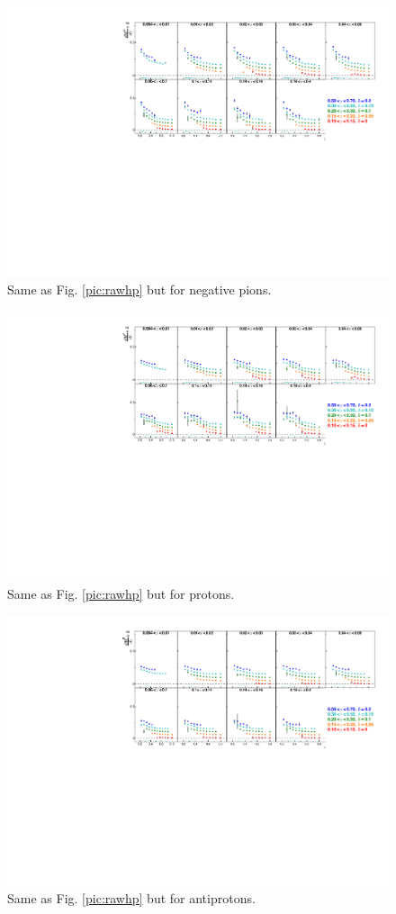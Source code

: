 \begin{figure}[!h]
  \includegraphics[scale=0.85]{./gfx/rawkm.pdf}
  \caption{Same as Fig. \ref{pic:rawhp} but for negative pions.}
  \label{pic:rawkm}
\end{figure}

\begin{figure}[!h]
  \includegraphics[scale=0.85]{./gfx/rawpp.pdf}
  \caption{Same as Fig. \ref{pic:rawhp} but for protons.}
  \label{pic:rawpp}
\end{figure}

\begin{figure}[!h]
  \includegraphics[scale=0.85]{./gfx/rawpm.pdf}
  \caption{Same as Fig. \ref{pic:rawhp} but for antiprotons.}
  \label{pic:rawpm}
\end{figure}
